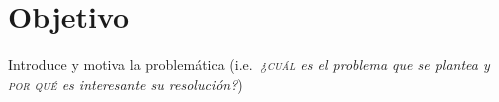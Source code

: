 \chapter{Objetivo}
\label{cap:Objetivo}

Introduce y motiva la problemática (i.e.\emph{\ ¿\textsc{cuál} es el problema que se plantea y \textsc{por qué} es interesante su resolución?})


